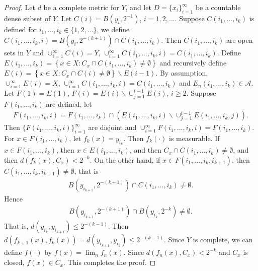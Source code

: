 \documentclass[11pt]{article}
\theoremstyle{plain}
\theoremstyle{definition}
\theoremstyle{remark}
\begin{document}
\begin{proof}
    Let $d$ be a complete metric for $Y$, and let $D=\{x_i\}_{i=1}^\infty$ be a countable dense subset of $Y$.
    Let $C(i) = B(y_i, 2^{-1})$, $i=1,2,\dots$.
    Suppose $C(i_1,\dots,i_k)$ is defined for $i_1,\dots,i_k \in \{1,2,\dots\}$, we define $C(i_1,\dots,i_k , i)= B(y_i, 2^{-(k+1)})\cap C(i_1,\dots,i_k)$.
    Then $C(i_1,\dots,i_k)$ are open sets in $Y$ and $\cup_{i=1}^\infty C(i) = Y$, $\cup_{i=1}^\infty C(i_1,\dots,i_k, i) = C(i_1,\dots,i_k)$.
    Define $E(i_1,\dots,i_k) = \left\{ x\in X : C_x \cap C(i_1,\dots,i_k) \neq \emptyset \right\}$ and recursively define $E(i) = \left\{ x\in X : C_x \cap C(i) \neq \emptyset \right\} \backslash E(i-1) $.
    By assumption, $\cup_{i=1}^\infty E(i) = X$, $\cup_{i=1}^\infty C(i_1,\dots,i_k , i) = C(i_1,\dots,i_k)$ and $E_n(i_1,\dots,i_k) \in \mathscr A$.
    Let $F(1)=E(1)$, $F(i)=E(i)\backslash \cup_{j=1}^{i-1} E(i)$, $i\geq 2$.
    Suppose $F(i_1,\dots,i_k)$ are defined, let
    \begin{align*}
        F(i_1,\dots,i_k, i)= F(i_1,\dots,i_k) \cap \left(  E(i_1,\dots,i_k, i) \backslash \cup_{j=1}^{i-1} E(i_1,\dots,i_k ,j)  \right).
    \end{align*}
    Then $\{F(i_1,\dots,i_k,i)\}_{i=1}^\infty$ are disjoint and $\cup_{i=1}^\infty F(i_1,\dots,i_k ,i ) = F(i_1,\dots,i_k)$.
    For $x \in F(i_1,\dots,i_k)$, let $f_k (x) = y_{i_k}$.
    Then $f_k (\cdot)$ is measurable.
    If $x \in F(i_1,\dots,i_k)$, then $x \in E(i_1,\dots,i_k)$, and then $C_x \cap C(i_1,\dots,i_k) \neq \emptyset$, and then 
    $d(f_k(x), C_x) < 2^{-k}$.
    On the other hand, 
    if $x \in F(i_1,\dots,i_k,i_{k+1})$, then $C(i_1,\dots,i_k, i_{k+1}) \neq \emptyset$, that is
    \begin{align*}
        B(y_{i_{k+1}}, 2^{-(k+1)}) \cap C(i_1,\dots,i_k) \neq \emptyset.
    \end{align*}
    Hence
    \begin{align*}
        B(y_{i_{k+1}}, 2^{-(k+1)}) \cap B(y_{i_k}, 2^{-k}) \neq \emptyset.
    \end{align*}
    That is, $d(y_{i_{k}}, y_{i_{k+1}})\leq 2^{-(k-1)} $.
    Then $d(f_{k+1}(x), f_k (x)) =d(y_{i_{k+1}},y_{i_k}) \leq 2^{-(k-1)} $.
    Since $Y$ is complete, we can define $f(\cdot)$ by $f(x) = \lim_n f_n(x)$.
    Since $d(f_n(x),C_x) < 2^{-k}$ and $C_x$ is closed, $f(x) \in C_x$.
    This completes the proof.

    
    
\end{proof}
\end{document}
